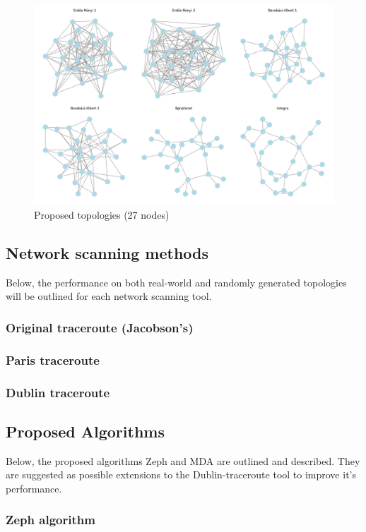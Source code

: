\begin{figure}
    \centering
    \includegraphics[width=0.8\linewidth]{images/Topology set/27.png}
    \caption{Proposed topologies (27 nodes)}
    \label{fig:27_prop}
\end{figure}

\subsection{Network scanning methods}
Below, the performance on both real-world and randomly generated topologies will be outlined for each network scanning tool. 

\subsubsection{Original traceroute (Jacobson's)}

\subsubsection{Paris traceroute}

\subsubsection{Dublin traceroute}

\subsection{Proposed Algorithms}
Below, the proposed algorithms Zeph and MDA are outlined and described. They are suggested as possible extensions to the Dublin-traceroute tool to improve it's performance.  

\subsubsection{Zeph algorithm}

